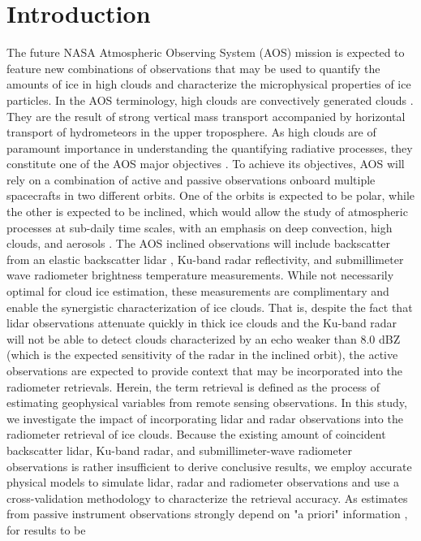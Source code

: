 \documentclass{ametsocV6.1}
\begin{document}
\section{Introduction}
The future NASA Atmospheric Observing System (AOS) mission \citep{braun2022} is expected to feature new combinations of observations that may be used to quantify the amounts of ice in high clouds and characterize the microphysical properties of ice particles. In the AOS terminology, high clouds are convectively generated clouds \citep{braun2022}. They are the result of strong vertical mass transport accompanied by
horizontal transport of hydrometeors in the upper troposphere.  As high clouds are of paramount importance in understanding the quantifying radiative processes, they constitute one of the AOS major objectives \citep{braun2022}. To achieve its objectives, AOS will rely on a combination of active and passive observations onboard multiple spacecrafts in two different orbits.  One of the orbits is expected to be polar, while the other is expected to be inclined, which would allow the study of atmospheric processes at sub-daily time scales, with an emphasis on deep convection, high clouds, and aerosols \citep{braun2022,yorks2022}. The AOS inclined observations will include backscatter from an elastic backscatter lidar \citep{weitkamp2006}, Ku-band radar reflectivity, and submillimeter wave radiometer brightness temperature measurements. 
While not necessarily optimal for cloud ice estimation, these measurements are complimentary and enable the synergistic characterization of ice clouds. That is, despite the fact that lidar observations attenuate quickly in thick ice clouds and the Ku-band radar will not be able to detect clouds 
characterized by an echo weaker than 8.0 dBZ (which is the expected sensitivity of the radar in the inclined
orbit), the active observations are expected to provide context 
that may be incorporated into the radiometer retrievals. Herein, the term retrieval is defined as the process of estimating geophysical variables from remote sensing observations.
In this study, we investigate the impact of 
incorporating lidar and radar observations into the radiometer retrieval of ice clouds. Because the existing amount of coincident backscatter lidar, Ku-band radar, and submillimeter-wave  radiometer observations is rather insufficient to derive conclusive results, we employ accurate 
physical models to simulate lidar, radar and radiometer observations and use a cross-validation methodology to characterize the retrieval accuracy. As estimates from passive instrument observations strongly depend on "a priori" information \citep{rodgers2000inverse}, for results to be 
\end{document}
